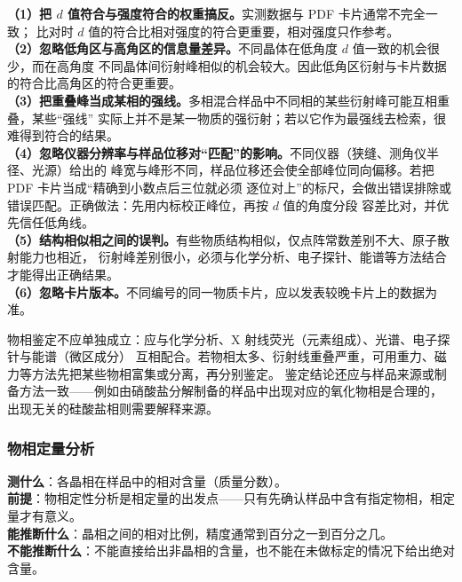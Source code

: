 \begin{pitfall}
\textbf{（1）把 $d$ 值符合与强度符合的权重搞反。}实测数据与 PDF 卡片通常不完全一致；
比对时 $d$ 值的符合比相对强度的符合更重要，相对强度只作参考。\\
\textbf{（2）忽略低角区与高角区的信息量差异。}不同晶体在低角度 $d$ 值一致的机会很少，而在高角度
不同晶体间衍射峰相似的机会较大。因此低角区衍射与卡片数据的符合比高角区的符合更重要。\\
\textbf{（3）把重叠峰当成某相的强线。}多相混合样品中不同相的某些衍射峰可能互相重叠，某些“强线”
实际上并不是某一物质的强衍射；若以它作为最强线去检索，很难得到符合的结果。\\
\textbf{（4）忽略仪器分辨率与样品位移对“匹配”的影响。}不同仪器（狭缝、测角仪半径、光源）给出的
峰宽与峰形不同，样品位移还会使全部峰位同向偏移。若把 PDF 卡片当成“精确到小数点后三位就必须
逐位对上”的标尺，会做出错误排除或错误匹配。正确做法：先用内标校正峰位，再按 $d$ 值的角度分段
容差比对，并优先信任低角线。\\
\textbf{（5）结构相似相之间的误判。}有些物质结构相似，仅点阵常数差别不大、原子散射能力也相近，
衍射峰差别很小，必须与化学分析、电子探针、能谱等方法结合才能得出正确结果。\\
\textbf{（6）忽略卡片版本。}不同编号的同一物质卡片，应以发表较晚卡片上的数据为准。
\end{pitfall}

\begin{crosscheck}
物相鉴定不应单独成立：应与化学分析、X 射线荧光（元素组成）、光谱、电子探针与能谱（微区成分）
互相配合。若物相太多、衍射线重叠严重，可用重力、磁力等方法先把某些物相富集或分离，再分别鉴定。
鉴定结论还应与样品来源或制备方法一致——例如由硝酸盐分解制备的样品中出现对应的氧化物相是合理的，
出现无关的硅酸盐相则需要解释来源。
\end{crosscheck}

\subsubsection{物相定量分析}

\begin{probout}
\textbf{测什么}：各晶相在样品中的相对含量（质量分数）。\\
\textbf{前提}：物相定性分析是相定量的出发点——只有先确认样品中含有指定物相，相定量才有意义。\\
\textbf{能推断什么}：晶相之间的相对比例，精度通常到百分之一到百分之几。\\
\textbf{不能推断什么}：不能直接给出非晶相的含量，也不能在未做标定的情况下给出绝对含量。
\end{probout}

